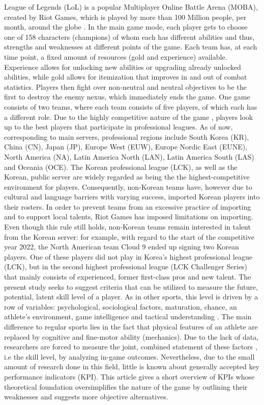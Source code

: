 \documentclass{article}
\begin{document}
League of Legends (LoL) is a popular Multiplayer Online Battle Arena (MOBA), created by Riot Games, which is played by more than 100 Million people, per month, around the globe \citep{kollar2016past}. In the main game mode, each player gets to choose one of 158 characters (champions) of whom each has different abilities and thus, strengths and weaknesses at different points of the game. Each team has, at each time point, a fixed amount of resources (gold and experience) available. Experience allows for unlocking new abilities or upgrading already unlocked abilities, while gold allows for itemization that improves in and out of combat statistics. Players then fight over non-neutral and neutral objectives to be the first to destroy the enemy nexus, which immediately ends the game. One game consists of two teams, where each team consists of five players, of which each has a different role. \newline Due to the highly competitive nature of the game \citep{kou2016ranking}, players look up to the best players that participate in professional leagues. As of now, corresponding to main servers, professional regions include South Korea (KR), China (CN), Japan (JP), Europe West (EUW), Europe Nordic East (EUNE), North America (NA), Latin America North (LAN), Latin America South (LAS) and Oceania (OCE). The Korean professional league (LCK), as well as the Korean, public server are widely regarded as being the the highest-competitive environment for players.  Consequently, non-Korean teams have, however due to cultural and language barriers with varying success, imported Korean players into their rosters. In order to prevent teams from an excessive practice of importing and to support local talents, Riot Games has imposed limitations on importing. Even though this rule still holds, non-Korean teams remain interested in talent from the Korean server: for example, with regard to the start of the competitive year 2022, the North American team Cloud 9 ended up signing two Korean players. One of these players did not play in Korea's highest professional league (LCK), but in the second highest professional league (LCK Challenger Series) that mainly consists of experienced, former first-class pros and new talent. The present study seeks to suggest criteria that can be utilized to measure the future, potential, latent skill level of a player. As in other sports, this level is driven by a row of variables: psychological, sociological factors, maturation, chance, an athlete's environment, game intelligence and tactical understanding \citep{williams2020talent}. The main difference to regular sports lies in the fact that physical features of an athlete are replaced by cognitive and fine-motor ability (mechanics). Due to the lack of data, researchers are forced to measure the joint, combined statement of these factors , i.e the skill level, by analyzing in-game outcomes. Nevertheless, due to the small amount of research done in this field, little is known about generally accepted key performance indicators (KPI). This article gives a short overview of KPIs whose theoretical foundation oversimplifies the nature of the game by outlining their weaknesses and suggests more objective alternatives.
\end{document}
